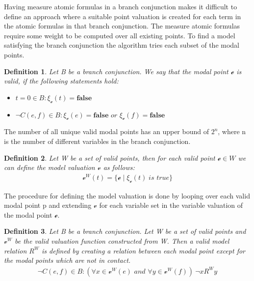 \documentclass{article}
\newtheorem{defn}{Definition}[section]
\newcommand{\curvedE}{\mathscr{e}}
\newcommand{\vE}{\mathscr{v}}
\newcommand{\vBool}{\xi}
\begin{document}
	Having measure atomic formulas in a branch conjunction makes it difficult to define an approach where a suitable point valuation is created for each term 
	in the atomic formulas in that branch conjunction.
	The measure atomic formulas require some weight to be computed over all existing points. 
	To find a model satisfying the branch conjunction the algorithm tries each subset of the modal points.

	\begin{defn}%
	Let B be a branch conjunction. We say that the modal point $\curvedE$ is valid, if the following statements hold:
	\begin{itemize}
		\item $t = 0 \in B:  \vBool_{\curvedE}(t) = \textbf{false}$
		\item $\neg C(e, f) \in B: \vBool_{\curvedE}(e) = \textbf{false} \textit{ or } \vBool_{\curvedE}(f) = \textbf{false}$
	\end{itemize}
	\end{defn}
	The number of all unique valid modal points has an upper bound of $2^n$, where n is the number of different variables in the branch	conjunction.


	\begin{defn}\label{compute-valuation}
	Let W be a set of valid points, then for each valid point $\curvedE \in W$ we can define the model valuation $\vE$ as follows:
	\begin{align*}
		\vE^W(t) = \{ \curvedE \; | \; \vBool_{\curvedE}(t) \; \textit{is true} \}
	\end{align*}
	\end{defn}

	The procedure for defining the model valuation is done by looping over each valid modal point p and extending $\vE$ for each variable set in the variable valuation of the modal point $\curvedE$.

	\begin{defn}\label{compute-relations}
	Let B be a branch conjunction. Let W be a set of valid points and $\vE^W$ be the valid valuation function constructed from W.
	Then a valid model relation $R^W$ is defined by creating a relation between each modal point except for the modal points which are not in contact.
	\begin{align*}
		\neg C(e, f) \in B: (\forall x \in \vE^W(e) \textit{ and } \forall y \in \vE^W(f)) \: \neg xR^Wy
	\end{align*}
	\end{defn}
\end{document}
